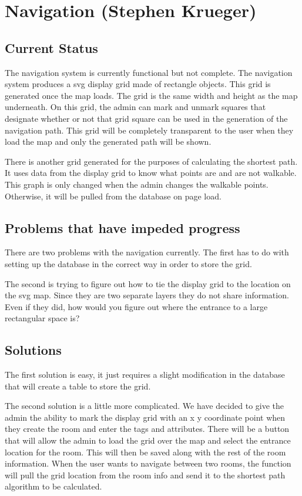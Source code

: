 \documentclass[letterpaper,10pt,titlepage, onecolumn, compsoc]{IEEEtran}
\begin{document}
\section{Navigation (Stephen Krueger)}
\subsection{Current Status}
The navigation system is currently functional but not complete. The navigation system produces a svg display grid made of rectangle objects. This grid is generated once the map loads. The grid is the same width and height as the map underneath. On this grid, the admin can mark and unmark squares that designate whether or not that grid square can be used in the generation of the navigation path. This grid will be completely transparent to the user when they load the map and only the generated path will be shown.
 
There is another grid generated for the purposes of calculating the shortest path. It uses data from the display grid to know what points are and are not walkable. This graph is only changed when the admin changes the walkable points. Otherwise, it will be pulled from the database on page load.

\subsection{Problems that have impeded progress}
There are two problems with the navigation currently. The first has to do with setting up the database in the correct way in order to store the grid.
 
The second is trying to figure out how to tie the display grid to the location on the svg map. Since they are two separate layers they do not share information. Even if they did, how would you figure out where the entrance to a large rectangular space is?

\subsection{Solutions}
The first solution is easy, it just requires a slight modification in the database that will create a table to store the grid.

The second solution is a little more complicated. We have decided to give the admin the ability to mark the display grid with an x y coordinate point when they create the room and enter the tags and attributes. There will be a button that will allow the admin to load the grid over the map and select the entrance location for the room. This will then be saved along with the rest of the room information. When the user wants to navigate between two rooms, the function will pull the grid location from the room info and send it to the shortest path algorithm to be calculated. 
\end{document}
